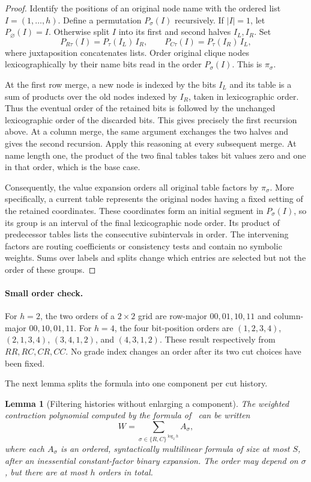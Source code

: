 \documentclass[11pt]{article}
\newtheorem{lemma}[theorem]{Lemma}
\theoremstyle{definition}
\theoremstyle{remark}
\begin{document}
\begin{proof}
Identify the positions of an original node name with the ordered list
$I=(1,\ldots,h)$. Define a permutation $P_\sigma(I)$ recursively.
If $|I|=1$, let $P_\varnothing(I)=I$. Otherwise split $I$ into its
first and second halves $I_L,I_R$. Set
\[
 P_{R\tau}(I)=P_\tau(I_L)\,I_R,
 \qquad
 P_{C\tau}(I)=P_\tau(I_R)\,I_L,
\]
where juxtaposition concatenates lists. Order original clique nodes
lexicographically by their name bits read in the order $P_\sigma(I)$.
This is $\pi_\sigma$.

At the first row merge, a new node is indexed by the bits $I_L$ and
its table is a sum of products over the old nodes indexed by $I_R$,
taken in lexicographic order. Thus the eventual order of the retained
bits is followed by the unchanged lexicographic order of the discarded
bits. This gives precisely the first recursion above. At a column merge,
the same argument exchanges the two halves and gives the second
recursion. Apply this reasoning at every subsequent merge. At name
length one, the product of the two final tables takes bit values zero
and one in that order, which is the base case.

Consequently, the value expansion orders all original table factors
by $\pi_\sigma$. More specifically, a current table represents the
original nodes having a fixed setting of the retained coordinates.
These coordinates form an initial segment in $P_\sigma(I)$, so its
group is an interval of the final lexicographic node order. Its product
of predecessor tables lists the consecutive subintervals in order.
The intervening factors are routing coefficients or consistency tests
and contain no symbolic weights. Sums over labels and splits change
which entries are selected but not the order of these groups.
\end{proof}

\paragraph{Small order check.}
For $h=2$, the two orders of a $2\times2$ grid are row-major
$00,01,10,11$ and column-major $00,10,01,11$. For $h=4$, the four
bit-position orders are $(1,2,3,4)$, $(2,1,3,4)$,
$(3,4,1,2)$, and $(4,3,1,2)$. These result respectively from
$RR,RC,CR,CC$. No grade index changes an order after its two cut choices
have been fixed.

The next lemma splits the formula into one component per cut history.

\begin{lemma}[Filtering histories without enlarging a component]
\label{lem:filter-histories}
The weighted contraction polynomial computed by the formula
of~\cite{Cruz26} can be written
\[
 W=\sum_{\sigma\in\{R,C\}^{\log_2h}} A_\sigma,
\]
where each $A_\sigma$ is an ordered, syntactically multilinear formula
of size at most $S$, after an inessential constant-factor binary
expansion. The order may depend on $\sigma$, but there are at most $h$
orders in total.
\end{lemma}
\end{document}

